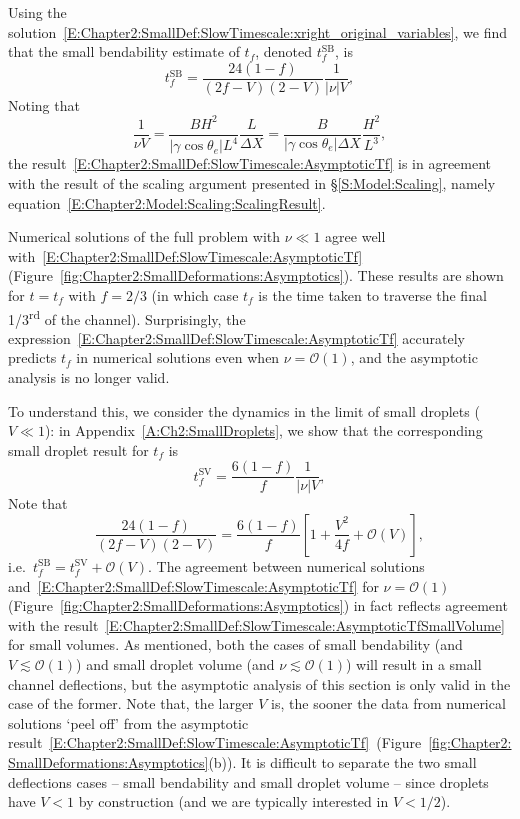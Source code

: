 Using the solution~\eqref{E:Chapter2:SmallDef:SlowTimescale:xright_original_variables}, we find that the small bendability estimate of $t_f$, denoted $t_f^\text{SB}$, is
\begin{equation}\label{E:Chapter2:SmallDef:SlowTimescale:AsymptoticTf}
t_f^{\text{SB}} = \frac{24(1 - f)}{(2f - V)(2 - V)}\frac{1}{|\nu| V},
\end{equation}
Noting that
\begin{equation}\label{E:Chapter2:SmallDef:SlowTimescale:ComparisonToScaling}
\frac{1}{\nu V} =  \frac{B H^2}{|\gamma \cos \theta_e| L^4}\frac{L}{\Delta X}  =  \frac{B}{|\gamma \cos \theta_e| \Delta X}\frac{H^2}{L^3},
\end{equation}
the result~\eqref{E:Chapter2:SmallDef:SlowTimescale:AsymptoticTf} is in agreement with the result of the scaling argument presented in \S\ref{S:Model:Scaling}, namely equation~\eqref{E:Chapter2:Model:Scaling:ScalingResult}.

Numerical solutions of the full problem with $\nu \ll 1$ agree well with~\eqref{E:Chapter2:SmallDef:SlowTimescale:AsymptoticTf} (Figure~\ref{fig:Chapter2:SmallDeformations:Asymptotics}). These results are shown for $t = t_f$ with $f = 2/3$ (in which case $t_f$ is the time taken to traverse the final 1/3\textsuperscript{rd} of the channel). Surprisingly, the expression~\eqref{E:Chapter2:SmallDef:SlowTimescale:AsymptoticTf} accurately predicts $t_f$ in numerical solutions even when $\nu = \mathcal{O}(1)$, and the asymptotic analysis is no longer valid.

To understand this, we consider the dynamics in the limit of small droplets ($V \ll 1$): in Appendix~\ref{A:Ch2:SmallDroplets}, we show that the corresponding small droplet result for $t_f$ is
\begin{equation}\label{E:Chapter2:SmallDef:SlowTimescale:AsymptoticTfSmallVolume} t_f^{\text{SV}} = \frac{6(1 - f)}{f}\frac{1}{|\nu| V},
\end{equation}
Note that
\begin{equation}
\frac{24(1 - f)}{(2f - V)(2 - V)} =  \frac{6(1 - f)}{f}\left[1 + \frac{V^2}{4f} + \mathcal{O}(V)\right],
\end{equation}
i.e.~$t_f^{\text{SB}} = t_f^{\text{SV}} + \mathcal{O}(V)$. The agreement between numerical solutions and~\eqref{E:Chapter2:SmallDef:SlowTimescale:AsymptoticTf}  for $\nu = \mathcal{O}(1)$ (Figure~\ref{fig:Chapter2:SmallDeformations:Asymptotics}) in fact reflects agreement with the result~\eqref{E:Chapter2:SmallDef:SlowTimescale:AsymptoticTfSmallVolume} for small volumes. As mentioned, both the cases of small bendability (and $V \lesssim \mathcal{O}(1)$) and small droplet volume (and $\nu \lesssim \mathcal{O}(1)$) will result in a small channel deflections, but the asymptotic analysis of this section is only valid in the case of the former. Note that, the larger $V$ is, the sooner the data from numerical solutions `peel off' from the asymptotic result~\eqref{E:Chapter2:SmallDef:SlowTimescale:AsymptoticTf}~(Figure~\ref{fig:Chapter2:SmallDeformations:Asymptotics}(b)). It is difficult to separate the two small deflections cases -- small bendability and small droplet volume -- since droplets have $V < 1$ by construction (and we are typically interested in $V < 1/2$).


